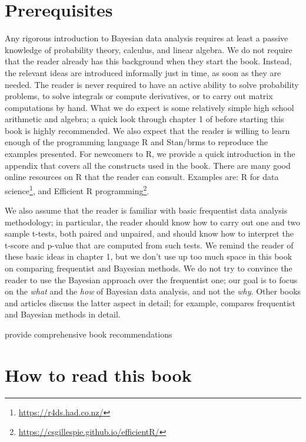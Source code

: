 \documentclass[12pt,]{krantz}
\renewcommand{\href}[2]{#2\footnote{\url{#1}}}
\theoremstyle{definition}
\theoremstyle{definition}
\theoremstyle{definition}
\theoremstyle{remark}
\let\BeginKnitrBlock\begin \let\EndKnitrBlock\end
\begin{document}
\hypertarget{prerequisites}{%
\section{Prerequisites}\label{prerequisites}}

Any rigorous introduction to Bayesian data analysis requires at least a passive knowledge of probability theory, calculus, and linear algebra. We do not require that the reader already has this background when they start the book. Instead, the relevant ideas are introduced informally just in time, as soon as they are needed. The reader is never required to have an active ability to solve probability problems, to solve integrals or compute derivatives, or to carry out matrix computations by hand. What we do expect is some relatively simple high school arithmetic and algebra; a quick look through chapter 1 of \citet{gill2006essential} before starting this book is highly recommended. We also expect that the reader is willing to learn enough of the programming language R \citep{R-base} and Stan/brms to reproduce the examples presented.
For newcomers to R, we provide a quick introduction in the appendix that covers all the constructs used in the book.
There are many good online resources on R that the reader can consult. Examples are: \href{https://r4ds.had.co.nz/}{R for data science}, and \href{https://csgillespie.github.io/efficientR/}{Efficient R programming}.

We also assume that the reader is familiar with basic frequentist data analysis methodology; in particular, the reader should know how to carry out one and two sample t-tests, both paired and unpaired, and should know how to interpret the t-score and p-value that are computed from such tests. We remind the reader of these basic ideas in chapter 1, but we don't use up too much space in this book on comparing frequentist and Bayesian methods. We do not try to convince the reader to use the Bayesian approach over the frequentist one; our goal is to focus on the \emph{what} and the \emph{how} of Bayesian data analysis, and not the \emph{why}. Other books and articles discuss the latter aspect in detail; for example, \citet{kruschke2014doing} compares frequentist and Bayesian methods in detail.

\BeginKnitrBlock{rmdnote}
provide comprehensive book recommendations
\EndKnitrBlock{rmdnote}

\hypertarget{how-to-read-this-book}{%
\section{How to read this book}\label{how-to-read-this-book}}
\end{document}
